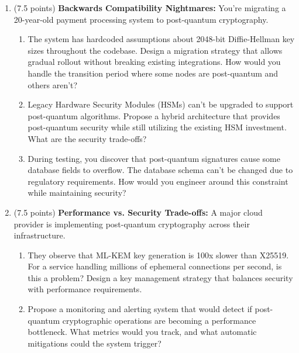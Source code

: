 \documentclass[10pt,a4paper,american]{exam}
\begin{document}
\begin{enumerate}
	\item (7.5 points) \textbf{Backwards Compatibility Nightmares:}
	      You're migrating a 20-year-old payment processing system to post-quantum cryptography.
	      \begin{enumerate}
		      \item The system has hardcoded assumptions about 2048-bit Diffie-Hellman key sizes throughout the codebase. Design a migration strategy that allows gradual rollout without breaking existing integrations. How would you handle the transition period where some nodes are post-quantum and others aren't?
		      \item Legacy Hardware Security Modules (HSMs) can't be upgraded to support post-quantum algorithms. Propose a hybrid architecture that provides post-quantum security while still utilizing the existing HSM investment. What are the security trade-offs?
		      \item During testing, you discover that post-quantum signatures cause some database fields to overflow. The database schema can't be changed due to regulatory requirements. How would you engineer around this constraint while maintaining security?
	      \end{enumerate}
	\item (7.5 points) \textbf{Performance vs. Security Trade-offs:}
	      A major cloud provider is implementing post-quantum cryptography across their infrastructure.
	      \begin{enumerate}
		      \item They observe that ML-KEM key generation is 100x slower than X25519. For a service handling millions of ephemeral connections per second, is this a problem? Design a key management strategy that balances security with performance requirements.
		      \item Propose a monitoring and alerting system that would detect if post-quantum cryptographic operations are becoming a performance bottleneck. What metrics would you track, and what automatic mitigations could the system trigger?
	      \end{enumerate}
\end{enumerate}
\end{document}
